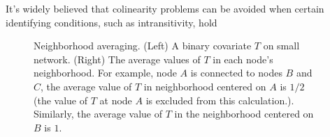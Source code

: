\documentclass[final]{beamer}
\newlength{\sepwidth}
\newlength{\colwidth}
\newcommand{\separatorcolumn}{\begin{column}{\sepwidth}\end{column}}
\begin{document}
\begin{frame}[t]
\begin{columns}[t]
\begin{column}{\colwidth}
\begin{block}{It's widely believed that colinearity problems can be avoided when certain identifying conditions, such as intransitivity, hold}
\begin{figure}
\begin{minipage}{0.49\textwidth}
                    \end{minipage}
                    \begin{minipage}{0.49\textwidth}
                        \centering
                    \end{minipage}
                    \caption{Neighborhood averaging. (Left) A binary covariate $T$ on small network. (Right) The  average values of $T$ in each node's neighborhood. For example, node $A$ is connected to nodes $B$ and $C$, the average value of $T$ in neighborhood centered on $A$ is $1/2$ (the value of $T$ at node $A$ is excluded from this calculation.). Similarly, the average value of $T$ in the neighborhood centered on $B$ is $1$.}
                    \label{fig:averaging}
                \end{figure}
            \end{block}
        \end{column}

        \separatorcolumn


\end{columns}
\end{frame}
\end{document}
